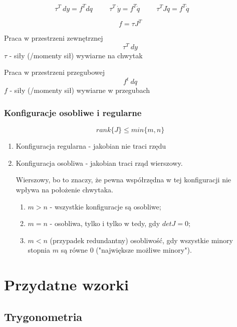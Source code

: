 \documentclass{article}
\newenvironment{kol2}{\noindent \begin{minipage}[t]{0.5\linewidth}}{\end{minipage}}
\begin{document}
$$  \tau^T\ dy = f^T dq                 \hspace{1cm}
    \tau^T\ \dot{y} = f^T \dot{q}       \hspace{1cm}
    \tau^T J \dot{q} = f^T \dot{q}      \hspace{1cm}
$$

\Large
$$ f = \tau J^T $$
\normalsize

\begin{kol2}
    Praca w przestrzeni zewnętrznej
    $$ \tau^T\ dy $$
    $\tau$ - siły (/momenty sił) wywiarne na chwytak
\end{kol2}
\begin{kol2}
    Praca w przestrzeni przegubowej
    $$ f^t\ dq$$
    $f$ - siły (/momenty sił) wywiarne w przegubach
\end{kol2}

\subsubsection{Konfiguracje osobliwe i regularne}

$$ rank\{J\} \leq min\{ m, n \} $$

\begin{enumerate}
    \item Konfiguracja regularna - jakobian nie traci rzędu
    \item Konfiguracja osobliwa - jakobian traci rząd wierszowy.

    Wierszowy, bo to znaczy, że pewna współrzędna w tej konfiguracji nie wpływa na położenie chwytaka.

    \begin{enumerate}
        \item $m > n$ - wszystkie konfiguracje są osobliwe;
        \item $m = n$ - osobliwa, tylko i tylko w tedy, gdy $ det{J} = 0$;
        \item $m < n$ (przypadek redundantny) osobliwość,
        gdy wszystkie minory stopnia $m$ są równe $0$ ("największe możliwe minory").
    \end{enumerate}

\end{enumerate}

\newpage

\section{Przydatne wzorki}
\subsection{Trygonometria}
\end{document}
